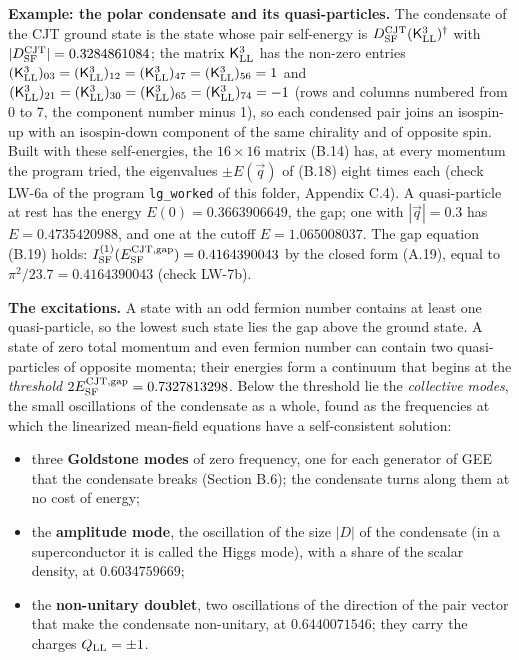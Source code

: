 \documentclass[
  10pt,
]{article}
\providecommand{\tightlist}{%
  \setlength{\itemsep}{0pt}\setlength{\parskip}{0pt}}
\begin{document}
\textbf{Example: the polar condensate and its quasi-particles.} The
condensate of the CJT ground state is the state whose pair self-energy
is \(D^{\rm CJT}_{\rm SF}(\mathsf K^3_{\rm LL})^\dagger\) with
\(|D^{\rm CJT}_{\rm SF}|=0.3284861084\); the matrix
\(\mathsf K^3_{\rm LL}\) has the non-zero entries
\((\mathsf K^3_{\rm LL})_{03}=(\mathsf K^3_{\rm LL})_{12}=(\mathsf K^3_{\rm LL})_{47}=(\mathsf K^3_{\rm LL})_{56}=1\)
and
\((\mathsf K^3_{\rm LL})_{21}=(\mathsf K^3_{\rm LL})_{30}=(\mathsf K^3_{\rm LL})_{65}=(\mathsf K^3_{\rm LL})_{74}=-1\)
(rows and columns numbered from 0 to 7, the component number minus 1),
so each condensed pair joins an isospin-up with an isospin-down
component of the same chirality and of opposite spin. Built with these
self-energies, the \(16\times16\) matrix (B.14) has, at every momentum
the program tried, the eigenvalues \(\pm E(\vec q)\) of (B.18) eight
times each (check LW-6a of the program \texttt{lg\_worked} of this
folder, Appendix C.4). A quasi-particle at rest has the energy
\(E(0)=0.3663906649\), the gap; one with \(|\vec q|=0.3\) has
\(E=0.4735420988\), and one at the cutoff \(E=1.065008037\). The gap
equation (B.19) holds:
\(I^{(1)}_{\rm SF}(E^{\rm CJT,gap}_{\rm SF})=0.4164390043\) by the
closed form (A.19), equal to \(\pi^2/23.7=0.4164390043\) (check LW-7b).

\textbf{The excitations.} A state with an odd fermion number contains at
least one quasi-particle, so the lowest such state lies the gap above
the ground state. A state of zero total momentum and even fermion number
can contain two quasi-particles of opposite momenta; their energies form
a continuum that begins at the \emph{threshold}
\(2E^{\rm CJT,gap}_{\rm SF}=0.7327813298\). Below the threshold lie the
\emph{collective modes}, the small oscillations of the condensate as a
whole, found as the frequencies at which the linearized mean-field
equations have a self-consistent solution:

\begin{itemize}
\tightlist
\item
  three \textbf{Goldstone modes} of zero frequency, one for each
  generator of GEE that the condensate breaks (Section B.6); the
  condensate turns along them at no cost of energy;
\item
  the \textbf{amplitude mode}, the oscillation of the size \(|D|\) of
  the condensate (in a superconductor it is called the Higgs mode), with
  a share of the scalar density, at \(0.6034759669\);
\item
  the \textbf{non-unitary doublet}, two oscillations of the direction of
  the pair vector that make the condensate non-unitary, at
  \(0.6440071546\); they carry the charges \(Q_{\rm LL}=\pm1\).
\end{itemize}
\end{document}
